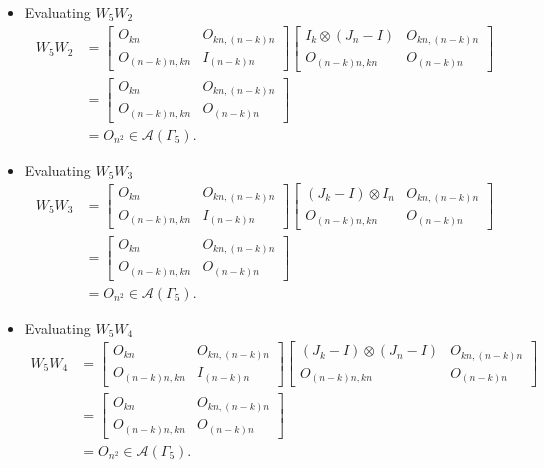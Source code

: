 \begin{itemize}
\item Evaluating $W_{5}W_{2}$
\begin{align*}
    W_5W_2
    &= \begin{bmatrix}
        O_{kn} & O_{kn, (n-k)n} \\
        O_{(n-k)n,kn} & I_{(n - k)n}
    \end{bmatrix}
    \begin{bmatrix}
        I_k\otimes (J_n-I) & O_{kn, (n-k)n} \\
        O_{(n-k)n,kn} & O_{(n - k)n}
    \end{bmatrix}\\
    &= \begin{bmatrix}
        O_{kn} & O_{kn, (n-k)n} \\
        O_{(n-k)n,kn} & O_{(n - k)n} 
    \end{bmatrix}\\
    &= O_{n^2}\in\mathcal{A}(\Gamma_5).
\end{align*}

\item Evaluating $W_{5}W_{3}$
\begin{align*}
    W_5W_3
    &= \begin{bmatrix}
        O_{kn} & O_{kn, (n-k)n} \\
        O_{(n-k)n,kn} & I_{(n - k)n}
    \end{bmatrix}
    \begin{bmatrix}
        (J_k-I)\otimes I_n & O_{kn, (n-k)n} \\
        O_{(n-k)n,kn} & O_{(n - k)n}
    \end{bmatrix}\\
    &= \begin{bmatrix}
        O_{kn} & O_{kn, (n-k)n} \\
        O_{(n-k)n,kn} & O_{(n - k)n} 
    \end{bmatrix}\\
    &= O_{n^2}\in\mathcal{A}(\Gamma_5).
\end{align*}

\item Evaluating $W_{5}W_{4}$
\begin{align*}
    W_5W_4
    &= \begin{bmatrix}
        O_{kn} & O_{kn, (n-k)n} \\
        O_{(n-k)n,kn} & I_{(n - k)n}
    \end{bmatrix}
    \begin{bmatrix}
        (J_k-I)\otimes (J_n-I) & O_{kn, (n-k)n} \\
        O_{(n-k)n,kn} & O_{(n - k)n}
    \end{bmatrix}\\
    &= \begin{bmatrix}
        O_{kn} & O_{kn, (n-k)n} \\
        O_{(n-k)n,kn} & O_{(n - k)n} 
    \end{bmatrix}\\
    &= O_{n^2}\in\mathcal{A}(\Gamma_5).
\end{align*}


\end{itemize}
